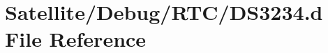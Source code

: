 \hypertarget{_debug_2_r_t_c_2_d_s3234_8d}{\section{Satellite/\-Debug/\-R\-T\-C/\-D\-S3234.d File Reference}
\label{_debug_2_r_t_c_2_d_s3234_8d}
}
